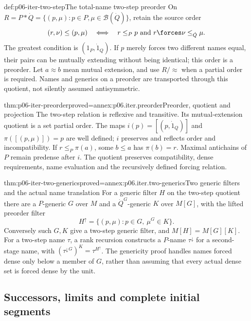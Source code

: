 \begin{hbdefinition}{def:p06-iter-two-step}{The total-name two-step preorder}
On \(R=P*\dot Q=\{(p,\mu):p\in P,\mu\in\mathcal B(\dot Q)\}\),
retain the source order
\[
 (r,\nu)\leq(p,\mu)
 \quad\Longleftrightarrow\quad r\leq_P p
       \text{ and }r\forces\nu\leq_{\dot Q}\mu.
\]
The greatest condition is \((1_P,\dot 1_Q)\).
If \(p\) merely forces two different names equal, their pairs can be
mutually extending without being identical; this order is a preorder.
Let \(a\approx b\) mean mutual extension, and use \(R/{\approx}\)
when a partial order is required. Names and generics on a preorder are
transported through this quotient, not silently assumed antisymmetric.
\end{hbdefinition}

\begin{hblemma}{thm:p06-iter-preorder}{proved=annex:p06.iter.preorder}{Preorder, quotient and projection}
The two-step relation is reflexive and transitive. Its mutual-extension
quotient is a set partial order. The maps
\(i(p)=[(p,\dot 1_Q)]\) and \(\pi([(p,\mu)])=p\) are well defined;
\(i\) preserves and reflects order and incompatibility. If
\(r\leq_P\pi(a)\), some \(b\leq a\) has \(\pi(b)=r\).
Maximal antichains of \(P\) remain predense after \(i\).
The quotient preserves compatibility, dense requirements, name
evaluation and the recursively defined forcing relation.
\end{hblemma}

\begin{hbtheorem}{thm:p06-iter-two-generics}{proved=annex:p06.iter.two-generics}{Two generic filters and the actual name translation}
For a generic filter \(H\) on the two-step quotient there are a
\(P\)-generic \(G\) over \(M\) and a \(\dot Q^G\)-generic \(K\)
over \(M[G]\), with the lifted preorder filter
\[
 H^\uparrow=\{(p,\mu):p\in G,\ \mu^G\in K\}.
\]
Conversely such \(G,K\) give a two-step generic filter, and
\(M[H]=M[G][K]\). For a two-step name \(\tau\), a rank recursion
constructs a \(P\)-name \(\tau^\downarrow\) for a second-stage name,
with \((\tau^\downarrow{}^G)^K=\tau^{H^\uparrow}\).
The genericity proof handles names forced dense only below a member of
\(G\), rather than assuming that every actual dense set is forced
dense by the unit.
\end{hbtheorem}

\subsection{Successors, limits and complete initial segments}

